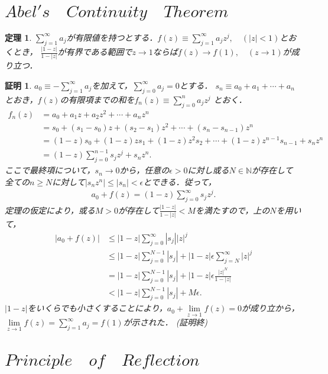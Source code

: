 \documentclass[a4j,papersize,disablejfam,slide,14pt]{jsarticle}
\newtheorem{Prop}{定理}
\newtheorem{Proof}{証明}
\def\qed{{(証明終)}} %
\begin{document}
\section{$Abel's\quad Continuity\quad Theorem$}
\label{sec:appendix_abel_theorem}
	\begin{screen}
    	\begin{Prop}
        	$\sum\limits_{j=1}^{\infty} a_j$が有限値を持つとする．$f(z) \equiv \sum\limits_{j=1}^{\infty} a_j z^j,\quad (|z| < 1)$とおくとき，
            $\frac{|1-z|}{1-|z|}$が有界である範囲で$z \to 1$ならば$f(z) \to f(1),\quad (z \to 1)$が成り立つ．
        \end{Prop}
    \end{screen}
    \begin{Proof}
    	$a_0 \equiv - \sum\limits_{j=1}^{\infty} a_j$を加えて，$\sum\limits_{j=0}^{\infty} a_j = 0$とする．
        $s_n \equiv a_0 + a_1 + \cdots + a_n$とおき，$f(z)$の有限項までの和を$f_n(z) \equiv \sum\limits_{j=0}^{n} a_j z^j$
        とおく．
        \begin{align}
        	f_n(z) &= a_0 + a_1 z + a_2 z^2 + \cdots + a_n z^n \\
            &= s_0 + (s_1 - s_0)z + (s_2 - s_1)z^2 + \cdots + (s_n - s_{n-1})z^n \\
            &= (1-z)s_0 + (1-z) z s_1 + (1-z) z^2 s_2 + \cdots + (1-z) z^{n-1} s_{n-1} + s_n z^n \\
            &= (1-z) \sum_{j=0}^{n-1} s_j z^j + s_n z^n.
        \end{align}
        ここで最終項について，$s_n \to 0$から，任意の$\epsilon > 0$に対し或る$N \in \mathbb{N}$が存在して
        全ての$n \geq N$に対して$| s_n z^n | \leq |s_n| < \epsilon$とできる．従って，
        \begin{align}
        	a_0 + f(z) = (1-z) \sum_{j=0}^{\infty} s_j z^j.
        \end{align}
        定理の仮定により，或る$M > 0$が存在して$\frac{|1-z|}{1-|z|} < M$を満たすので，上の$N$を用いて，
        \begin{align}
        	|a_0 + f(z)| &\leq |1-z| \sum_{j=0}^{\infty} |s_j||z|^j \\
            &\leq |1-z| \sum_{j=0}^{N-1} |s_j| + |1-z| \epsilon \sum_{j=N}^{\infty} |z|^j \\
            &= |1-z| \sum_{j=0}^{N-1} |s_j| + |1-z| \epsilon \frac{|z|^N}{1-|z|} \\
            &< |1-z| \sum_{j=0}^{N-1} |s_j| + M\epsilon.
        \end{align}
        $|1-z|$をいくらでも小さくすることにより，$a_0 + \lim\limits_{z \to 1}f(z) = 0$が成り立から，
        $\lim\limits_{z \to 1} f(z) = \sum\limits_{j=1}^{\infty} a_j = f(1)$が示された．
        \qed
    \end{Proof}

\section{$Principle\quad of\quad Reflection$}
\end{document}
